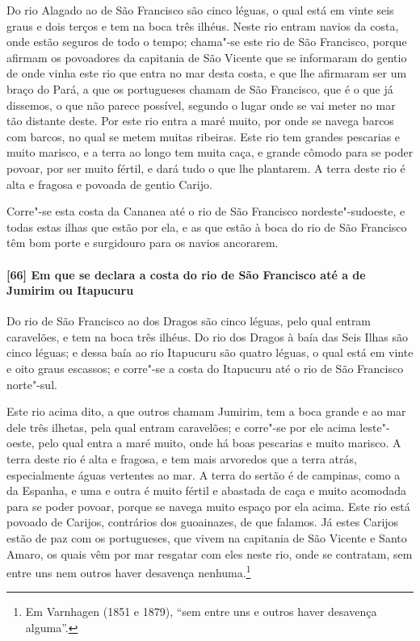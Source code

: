 Do rio Alagado ao de São Francisco são cinco léguas, o qual está em vinte seis graus e
dois terços e tem na boca três ilhéus. Neste rio entram navios da costa, onde estão
seguros de todo o tempo; chama"-se este rio de São Francisco, porque afirmam os povoadores
da capitania de São Vicente que se informaram do gentio de onde vinha este rio que entra
no mar desta costa, e que lhe afirmaram ser um braço do Pará, a que os portugueses chamam
de São Francisco, que é o que já dissemos, o que não parece possível, segundo o lugar onde
se vai meter no mar tão distante deste. Por este rio entra a maré muito, por onde se
navega barcos com barcos, no qual se metem muitas ribeiras. Este rio tem grandes pescarias
e muito marisco, e a terra ao longo tem muita caça, e grande cômodo para se poder povoar,
por ser muito fértil, e dará tudo o que lhe plantarem. A terra deste rio é alta e fragosa
e povoada de gentio Carijo.

Corre"-se esta costa da Cananea até o rio de São Francisco nordeste"-sudoeste, e todas estas
ilhas que estão por ela, e as que estão à boca do rio de São Francisco têm bom porte e
surgidouro para os navios ancorarem.

\paragraph{[66] Em que se declara a costa do rio de São Francisco até a de Jumirim ou
Itapucuru} \quad
Do rio de São Francisco ao dos Dragos são cinco léguas, pelo qual entram caravelões, e tem
na boca três ilhéus. Do rio dos Dragos à baía das Seis Ilhas são cinco léguas; e dessa
baía ao rio Itapucuru são quatro léguas, o qual está em vinte e oito graus escassos; e
corre"-se a costa do Itapucuru até o rio de São Francisco norte"-sul.

Este rio acima dito, a que outros chamam Jumirim, tem a boca grande e ao mar dele três
ilhetas, pela qual entram caravelões; e corre"-se por ele acima leste"-oeste, pelo qual
entra a maré muito, onde há boas pescarias e muito marisco. A terra deste rio é alta e
fragosa, e tem mais arvoredos que a terra atrás, especialmente águas vertentes ao mar. A
terra do sertão é de campinas, como a da Espanha, e uma e outra é muito fértil e abastada
de caça e muito acomodada para se poder povoar, porque se navega muito espaço por ela
acima. Este rio está povoado de Carijos, contrários dos guoainazes, de que falamos. Já
estes Carijos estão de paz com os portugueses, que vivem na capitania de São Vicente e
Santo Amaro, os quais vêm por mar resgatar com eles neste rio, onde se contratam, sem
entre uns nem outros haver desavença nenhuma.\footnote{ Em Varnhagen (1851 e 1879), ``sem
entre uns e outros haver desavença alguma''.}


